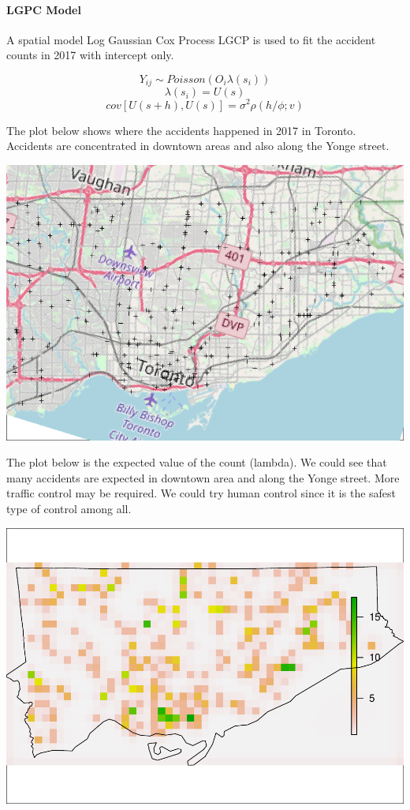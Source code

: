 \documentclass[]{article}
\let\oldparagraph\paragraph
\renewcommand{\paragraph}[1]{\oldparagraph{#1}\mbox{}}
\begin{document}
\paragraph{LGPC Model}\label{lgpc-model}

A spatial model Log Gaussian Cox Process LGCP is used to fit the
accident counts in 2017 with intercept only.

\begin{equation}
Y_{ij} \sim Poisson(O_{i}\lambda(s_{i}))
\end{equation}\begin{equation}
\lambda(s_{i}) = U(s)
\end{equation}\begin{equation}
cov[U(s + h), U(s)] = \sigma^2\rho(h/\phi;v)
\end{equation}

The plot below shows where the accidents happened in 2017 in Toronto.
Accidents are concentrated in downtown areas and also along the Yonge
street.

\includegraphics{Project_II-Final-20190404_files/figure-latex/unnamed-chunk-14-1.pdf}

The plot below is the expected value of the count (lambda). We could see
that many accidents are expected in downtown area and along the Yonge
street. More traffic control may be required. We could try human control
since it is the safest type of control among all.

\includegraphics{Project_II-Final-20190404_files/figure-latex/unnamed-chunk-15-1.pdf}
\end{document}
